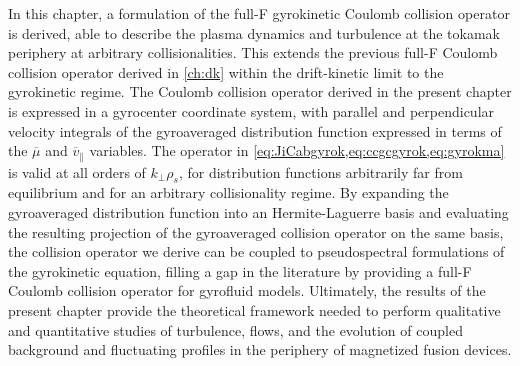 In this chapter, a formulation of the full-F gyrokinetic Coulomb collision operator is derived, able to describe the plasma dynamics and turbulence at the tokamak periphery at arbitrary collisionalities.
%
This extends the previous full-F Coulomb collision operator derived in \cref{ch:dk} within the drift-kinetic limit to the gyrokinetic regime.
%
The Coulomb collision operator derived in the present chapter is expressed in a gyrocenter coordinate system, with parallel and perpendicular velocity integrals of the gyroaveraged distribution function expressed in terms of the $\overline \mu$ and $\overline v_\parallel$ variables.
%
The operator in \cref{eq:JiCabgyrok,eq:ccgcgyrok,eq:gyrokma} is valid at all orders of $k_\perp \rho_s$, for distribution functions arbitrarily far from equilibrium and for an arbitrary collisionality regime.
%
By expanding the gyroaveraged distribution function into an Hermite-Laguerre basis and evaluating the resulting projection of the gyroaveraged collision operator on the same basis, the collision operator we derive can be coupled to pseudospectral formulations of the gyrokinetic equation, filling a gap in the literature by providing a full-F Coulomb collision operator for gyrofluid models.
%
Ultimately, the results of the present chapter provide the theoretical framework needed to perform qualitative and quantitative studies of turbulence, flows, and the evolution of coupled background and fluctuating profiles in the periphery of magnetized fusion devices.
